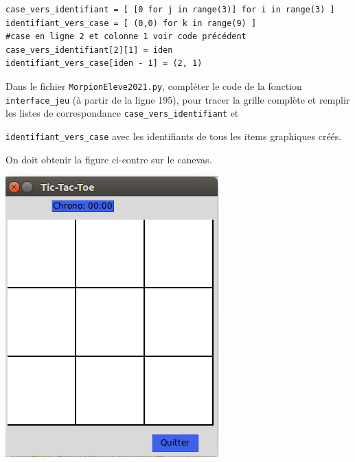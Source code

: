 \documentclass[a4paper, french, 12pt]{article}  %
\newcounter{exo}
\newcounter{exoB}
\newenvironment{exerciceB2}
{\par \bigskip  \noindent \addtocounter{exoB}{1} \hrulefill \quad { \large \textbf{Exercice \theexoB}} \quad \hrulefill \par \medskip }
{\par \bigskip }
\begin{document}
\begin{lstlisting}
case_vers_identifiant = [ [0 for j in range(3)] for i in range(3) ]
identifiant_vers_case = [ (0,0) for k in range(9) ]
#case en ligne 2 et colonne 1 voir code précédent
case_vers_identifiant[2][1] = iden
identifiant_vers_case[iden - 1] = (2, 1)
\end{lstlisting}

	 

\begin{exerciceB2}{}

Dans le fichier \texttt{MorpionEleve2021.py}, compléter   le code de la fonction \verb+interface_jeu+ (à partir de la ligne  195),  pour tracer la grille complète et remplir les listes de correspondance
\lstinline+case_vers_identifiant+ et 

\lstinline+identifiant_vers_case+ avec les identifiants de tous les items graphiques créés.

\begin{minipage}{0.6\linewidth}


On doit obtenir la figure ci-contre sur le canevas.
\end{minipage}\hfill
\begin{minipage}{0.35\linewidth}
\begin{center}
	\includegraphics[scale=0.5]{graphiques/morpion-blanc.png}
\end{center}
\end{minipage}
\end{exerciceB2}
\end{document}
